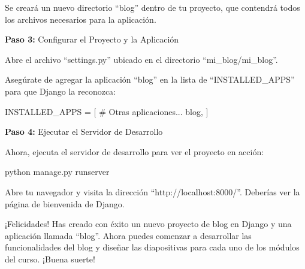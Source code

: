 \documentclass[
  letterpaper,
  DIV=11,
  numbers=noendperiod]{scrartcl}
\newenvironment{Shaded}{\begin{snugshade}}{\end{snugshade}}
\newcommand{\CommentTok}[1]{\textcolor[rgb]{0.37,0.37,0.37}{#1}}
\newcommand{\ExtensionTok}[1]{\textcolor[rgb]{0.00,0.23,0.31}{#1}}
\newcommand{\NormalTok}[1]{\textcolor[rgb]{0.00,0.23,0.31}{#1}}
\newcommand{\OperatorTok}[1]{\textcolor[rgb]{0.37,0.37,0.37}{#1}}
\newcommand{\StringTok}[1]{\textcolor[rgb]{0.13,0.47,0.30}{#1}}
\begin{document}
Se creará un nuevo directorio ``blog'' dentro de tu proyecto, que
contendrá todos los archivos necesarios para la aplicación.

\textbf{Paso 3:} Configurar el Proyecto y la Aplicación

Abre el archivo ``settings.py'' ubicado en el directorio
``mi\_blog/mi\_blog''.

Asegúrate de agregar la aplicación ``blog'' en la lista de
``INSTALLED\_APPS'' para que Django la reconozca:

\begin{Shaded}
\begin{Highlighting}[]
\NormalTok{INSTALLED\_APPS }\OperatorTok{=}\NormalTok{ [}
    \CommentTok{\# Otras aplicaciones...}
    \StringTok{\textquotesingle{}blog\textquotesingle{}}\NormalTok{,}
\NormalTok{]}
\end{Highlighting}
\end{Shaded}

\textbf{Paso 4:} Ejecutar el Servidor de Desarrollo

Ahora, ejecuta el servidor de desarrollo para ver el proyecto en acción:

\begin{Shaded}
\begin{Highlighting}[]
\ExtensionTok{python}\NormalTok{ manage.py runserver}
\end{Highlighting}
\end{Shaded}

Abre tu navegador y visita la dirección ``http://localhost:8000/''.
Deberías ver la página de bienvenida de Django.

¡Felicidades! Has creado con éxito un nuevo proyecto de blog en Django y
una aplicación llamada ``blog''. Ahora puedes comenzar a desarrollar las
funcionalidades del blog y diseñar las diapositivas para cada uno de los
módulos del curso. ¡Buena suerte!
\end{document}
